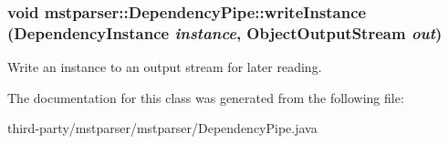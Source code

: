 \hypertarget{classmstparser_1_1DependencyPipe_a3ea85c069bcfe3ddfb89cb6c031d8f36}{
\subsubsection[{writeInstance}]{\setlength{\rightskip}{0pt plus 5cm}void mstparser::DependencyPipe::writeInstance ({\bf DependencyInstance} {\em instance}, \/  ObjectOutputStream {\em out})}}
\label{classmstparser_1_1DependencyPipe_a3ea85c069bcfe3ddfb89cb6c031d8f36}
Write an instance to an output stream for later reading. 

The documentation for this class was generated from the following file:\begin{DoxyCompactItemize}
\item 
third-\/party/mstparser/mstparser/DependencyPipe.java\end{DoxyCompactItemize}

